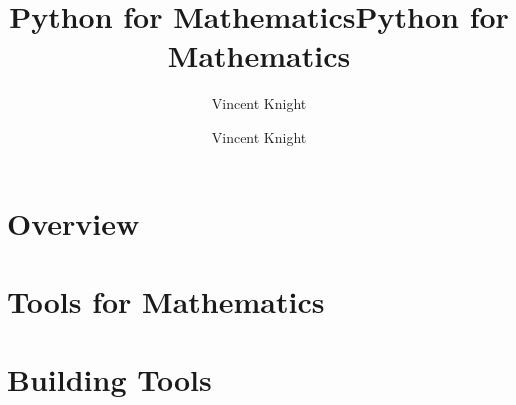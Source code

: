\documentclass[Alon2,singlecolor,10pt]{Alon}%
\title{Python for Mathematics}
\author{Vincent Knight}
\begin{document}
\frontmatter




\title{Python for Mathematics} %

\author{Vincent Knight}%


\maketitle


\cleardoublepage
\setcounter{page}{7} %
\tableofcontents



\mainmatter

\part{Overview}


\part{Tools for Mathematics}











\part{Building Tools}













\printindex
\cleardoublepage
\end{document}
